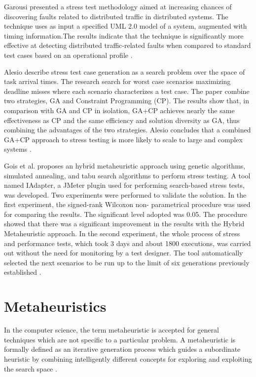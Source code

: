\documentclass[times]{stvrauth}
\begin{document}
Garousi presented a stress test methodology aimed at increasing chances of discovering faults related to distributed traffic in distributed systems. The technique uses as input a specified UML 2.0 model of a system, augmented with timing information.The results indicate that the technique is significantly more effective at detecting distributed traffic-related faults when compared to standard test cases based on an operational profile \cite{Garousi2006}.

Alesio describe stress test case generation as a search problem over the space of task arrival times. The research search for worst case scenarios maximizing deadline misses where each scenario characterizes a test case. The paper combine two strategies, GA and Constraint Programming (CP). The results show that, in comparison with GA and CP in isolation, GA+CP achieves nearly the same effectiveness as CP and the same efficiency and solution diversity as GA, thus combining the advantages of the two strategies. Alesio concludes that a combined GA+CP approach to stress testing is more likely to scale to large and complex systems \cite{Alesio2015}.

Gois et al. proposes an hybrid metaheuristic approach using genetic algorithms, simulated annealing, and tabu search algorithms to perform stress testing. A tool named IAdapter, a JMeter plugin used for performing search-based stress tests, was developed. Two experiments were performed to validate the solution. In the first experiment, the signed-rank Wilcoxon non- parametrical procedure was used for comparing the results. The significant level adopted was 0.05. The procedure showed that there was a significant improvement in the results with the Hybrid Metaheuristic approach.
In the second experiment, the whole process of stress and performance tests, which took 3 days and about 1800 executions, was carried out without the need for monitoring by a test designer. The tool automatically selected the next scenarios to be run up to the limit of six generations previously established \cite{Gois2016}. 


\section{Metaheuristics}

In the computer science, the term metaheuristic is accepted for general techniques which are not specific to a particular problem. A metaheuristic is formally defined as an iterative generation process which guides a subordinate heuristic by combining intelligently different concepts for exploring and exploiting the search space \cite{raidl2010metaheuristic}. 
\end{document}
